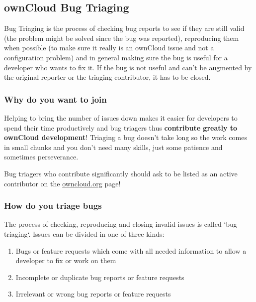 \documentclass[letterpaper,10pt,english]{sphinxmanual}
\begin{document}
\subsection{ownCloud Bug Triaging}
\label{bugtracker/triaging:transifex}\label{bugtracker/triaging::doc}\label{bugtracker/triaging:owncloud-bug-triaging}
Bug Triaging is the process of checking bug reports to see if they are still valid (the problem might be solved since the bug was reported), reproducing them when possible (to make sure it really is an ownCloud issue and not a configuration problem) and in general making sure the bug is useful for a developer who wants to fix it. If the bug is not useful and can't be augmented by the original reporter or the triaging contributor, it has to be closed.


\subsubsection{Why do you want to join}
\label{bugtracker/triaging:why-do-you-want-to-join}
Helping to bring the number of issues down makes it easier for developers to spend their time productively and bug triagers thus \textbf{contribute greatly to ownCloud development}! Triaging a bug doesn’t take long so the work comes in small chunks and you don’t need many skills, just some patience and sometimes perseverance.

Bug triagers who contribute significantly should ask to be listed as an active contributor on the \href{https://owncloud.org}{owncloud.org} page!


\subsubsection{How do you triage bugs}
\label{bugtracker/triaging:how-do-you-triage-bugs}
The process of checking, reproducing and closing invalid issues is called ‘bug triaging‘. Issues can be divided in one of three kinds:
\begin{enumerate}
\item {} 
Bugs or feature requests which come with all needed information to allow a developer to fix or work on them

\item {} 
Incomplete or duplicate bug reports or feature requests

\item {} 
Irrelevant or wrong bug reports or feature requests

\end{enumerate}
\end{document}
